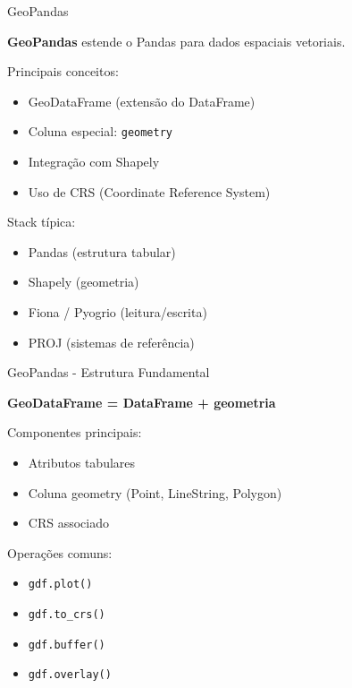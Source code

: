 \documentclass{beamer}
\begin{document}
\begin{frame}{GeoPandas}
    
    \textbf{GeoPandas} estende o Pandas para dados espaciais vetoriais.
    
    \vspace{0.4cm}
    
    Principais conceitos:
    
    \begin{itemize}
        \item GeoDataFrame (extensão do DataFrame)
        \item Coluna especial: \texttt{geometry}
        \item Integração com Shapely
        \item Uso de CRS (Coordinate Reference System)
    \end{itemize}
    
    \vspace{0.4cm}
    
    Stack típica:
    \begin{itemize}
        \item Pandas (estrutura tabular)
        \item Shapely (geometria)
        \item Fiona / Pyogrio (leitura/escrita)
        \item PROJ (sistemas de referência)
    \end{itemize}
    
\end{frame}

\begin{frame}{GeoPandas - Estrutura Fundamental}
    
    \textbf{GeoDataFrame = DataFrame + geometria}
    
    \vspace{0.4cm}
    
    Componentes principais:
    
    \begin{itemize}
        \item Atributos tabulares
        \item Coluna geometry (Point, LineString, Polygon)
        \item CRS associado
    \end{itemize}
    
    \vspace{0.4cm}
    
    Operações comuns:
    
    \begin{itemize}
        \item \texttt{gdf.plot()}
        \item \texttt{gdf.to\_crs()}
        \item \texttt{gdf.buffer()}
        \item \texttt{gdf.overlay()}
    \end{itemize}
    
\end{frame}
\end{document}
